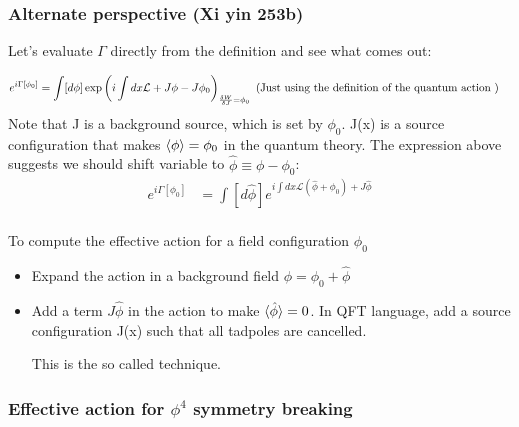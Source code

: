 \documentclass[11pt]{scrartcl}
\begin{document}
\subsubsection{Alternate perspective (Xi yin 253b)}
Let's evaluate $\Gamma$ directly from the definition and see what comes out:

\begin{align}
e^{i \Gamma[\phi_0]}  & = \int [d \phi] \exp \left({i \int dx \mathcal{L} + J \phi - J \phi_0} \right)_{{\delta W \over \delta J} = \phi_0} \text{ (Just using the definition of the quantum action )} 
\end{align}
Note that J is a background source, which is set by $\phi_0$.
J(x) is a source configuration that makes $\braket{ \phi } = \phi_0$ in the quantum theory.  
The expression above suggests
we should shift variable to $\hat{\phi} \equiv \phi - \phi_0$:
\begin{align}
 e^{i \Gamma[\phi_0]}& =  \int [d \hat{\phi}] e^{i \int dx \mathcal{L}(\hat{\phi} + \phi_0) + J \hat{\phi}} \\
\end{align}

To compute the effective action for a field configuration $\phi_0$
\begin{itemize}
\item Expand the action in a background field $\phi = \phi_0 + \hat{\phi}$
\item Add a term $J \hat{\phi}$ in the action to make $\braket{\hat{\phi}} = 0$.  In QFT language, add a source configuration J(x) such that all tadpoles are cancelled.

This is the so called  technique.
\end{itemize}

\subsubsection{Effective action for $\phi^4$ symmetry breaking}
\end{document}
